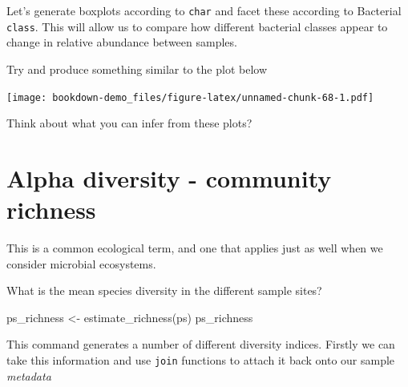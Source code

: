 \documentclass[
]{book}
\newenvironment{Shaded}{\begin{snugshade}}{\end{snugshade}}
\newcommand{\FunctionTok}[1]{\textcolor[rgb]{0.00,0.00,0.00}{#1}}
\newcommand{\NormalTok}[1]{#1}
\newcommand{\OtherTok}[1]{\textcolor[rgb]{0.56,0.35,0.01}{#1}}
\newcommand{\SpecialCharTok}[1]{\textcolor[rgb]{0.00,0.00,0.00}{#1}}
\newcommand{\StringTok}[1]{\textcolor[rgb]{0.31,0.60,0.02}{#1}}
\begin{document}
Let's generate boxplots according to \texttt{char} and facet these according to Bacterial \texttt{class}. This will allow us to compare how different bacterial classes appear to change in relative abundance between samples.

Try and produce something similar to the plot below

\texttt{[image: bookdown-demo\_files/figure-latex/unnamed-chunk-68-1.pdf]}

Think about what you can infer from these plots?

\hypertarget{alpha-diversity---community-richness}{%
\section{Alpha diversity - community richness}\label{alpha-diversity---community-richness}}

This is a common ecological term, and one that applies just as well when we consider microbial ecosystems.

What is the mean species diversity in the different sample sites?

\begin{Shaded}
\begin{Highlighting}[]
\NormalTok{ps\_richness }\OtherTok{\textless{}{-}} \FunctionTok{estimate\_richness}\NormalTok{(ps)}
\NormalTok{ps\_richness}
\end{Highlighting}
\end{Shaded}

This command generates a number of different diversity indices.
Firstly we can take this information and use \texttt{join} functions to attach it back onto our sample \emph{metadata}

\begin{Shaded}
\end{Shaded}
\end{document}
